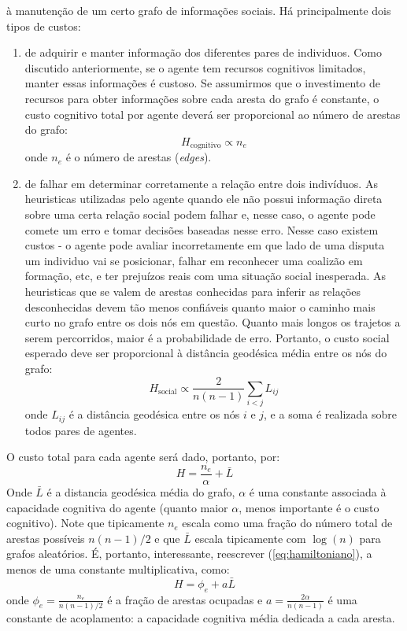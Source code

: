  à manutenção de um certo grafo de informações sociais. Há principalmente dois tipos de custos:  
\begin{enumerate}

\item {} de adquirir e manter informação dos diferentes pares de individuos. Como discutido anteriormente, se o agente tem recursos cognitivos limitados, manter essas informações é custoso. Se assumirmos que o investimento de recursos para obter informações sobre cada aresta do grafo é constante, o custo cognitivo total por agente deverá ser proporcional ao número de arestas do grafo:
\begin{equation}
   H_{\text{cognitivo}} \propto n_{e}
\end{equation}
onde $n_{e}$ é o número de arestas (\emph{edges}).

\item {} de falhar em determinar corretamente a relação entre dois indivíduos. As heuristicas utilizadas pelo agente quando ele não possui informação direta sobre uma certa relação social podem falhar e, nesse caso, o agente pode comete um erro e tomar decisões baseadas nesse erro. Nesse caso existem custos - o agente pode avaliar incorretamente em que lado de uma disputa um individuo vai se posicionar, falhar em reconhecer uma coalizão em formação, etc, e ter prejuízos reais com uma situação social inesperada. As heuristicas que se valem de arestas conhecidas para inferir as relações desconhecidas devem tão menos confiáveis quanto maior o caminho mais curto no grafo entre os dois nós em questão. Quanto mais longos os trajetos a serem percorridos, maior é a probabilidade de erro. Portanto, o custo social esperado deve ser proporcional à distância geodésica média entre os nós do grafo:
\begin{equation}
 H_{\text{social}} \propto \frac{2}{n(n-1)} \sum_{i<j}{L_{ij}}
\end{equation}
onde $L_{ij}$ é a distância geodésica entre os nós $i$ e $j$, e a soma é realizada sobre todos pares de agentes. 

\end{enumerate}
O custo total para cada agente será dado, portanto, por:
\begin{equation}
   \label{eq:hamiltoniano}
   H = \frac{n_{e}}{\alpha}  + \bar{L}
\end{equation}
Onde $\bar{L}$ é a distancia geodésica média do grafo, $\alpha$ é uma constante associada à capacidade cognitiva do agente (quanto maior $\alpha$, menos importante é o custo cognitivo). Note que tipicamente $n_{e}$ escala como uma fração do número total de arestas possíveis $n(n-1)/2$ e que $\bar{L}$ escala tipicamente com $\log(n)$ para grafos aleatórios. É, portanto, interessante, reescrever (\ref{eq:hamiltoniano}), a menos de uma constante multiplicativa, como:
\begin{equation}
   \label{eq:hamiltoniano2}
   H = \phi_{e}  + a \bar{L}
\end{equation}
onde $\phi_{e} = \frac{n_{e}}{n(n-1)/2}$ é a fração de arestas ocupadas e $a = \frac{2\alpha}{n(n-1)}$ é uma constante de acoplamento: a capacidade cognitiva média dedicada a cada aresta. 

